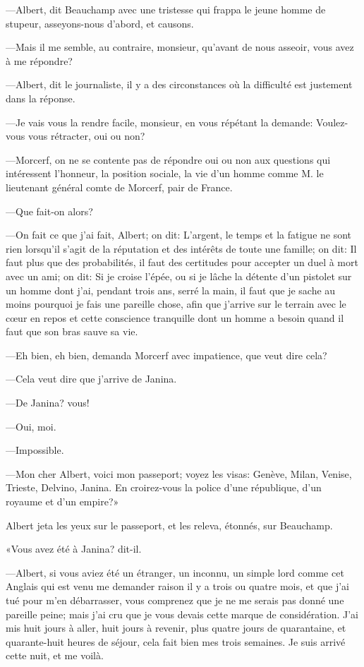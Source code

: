 —Albert, dit Beauchamp avec une tristesse qui frappa le jeune homme de stupeur, asseyons-nous d'abord, et causons. 

—Mais il me semble, au contraire, monsieur, qu'avant de nous asseoir, vous avez à me répondre? 

—Albert, dit le journaliste, il y a des circonstances où la difficulté est justement dans la réponse. 

—Je vais vous la rendre facile, monsieur, en vous répétant la demande: Voulez-vous vous rétracter, oui ou non? 

—Morcerf, on ne se contente pas de répondre oui ou non aux questions qui intéressent l'honneur, la position sociale, la vie d'un homme comme M. le lieutenant général comte de Morcerf, pair de France. 

—Que fait-on alors? 

—On fait ce que j'ai fait, Albert; on dit: L'argent, le temps et la fatigue ne sont rien lorsqu'il s'agit de la réputation et des intérêts de toute une famille; on dit: Il faut plus que des probabilités, il faut des certitudes pour accepter un duel à mort avec un ami; on dit: Si je croise l'épée, ou si je lâche la détente d'un pistolet sur un homme dont j'ai, pendant trois ans, serré la main, il faut que je sache au moins pourquoi je fais une pareille chose, afin que j'arrive sur le terrain avec le cœur en repos et cette conscience tranquille dont un homme a besoin quand il faut que son bras sauve sa vie. 

—Eh bien, eh bien, demanda Morcerf avec impatience, que veut dire cela? 

—Cela veut dire que j'arrive de Janina. 

—De Janina? vous! 

—Oui, moi. 

—Impossible. 

—Mon cher Albert, voici mon passeport; voyez les visas: Genève, Milan, Venise, Trieste, Delvino, Janina. En croirez-vous la police d'une république, d'un royaume et d'un empire?» 

Albert jeta les yeux sur le passeport, et les releva, étonnés, sur Beauchamp. 

«Vous avez été à Janina? dit-il. 

—Albert, si vous aviez été un étranger, un inconnu, un simple lord comme cet Anglais qui est venu me demander raison il y a trois ou quatre mois, et que j'ai tué pour m'en débarrasser, vous comprenez que je ne me serais pas donné une pareille peine; mais j'ai cru que je vous devais cette marque de considération. J'ai mis huit jours à aller, huit jours à revenir, plus quatre jours de quarantaine, et quarante-huit heures de séjour, cela fait bien mes trois semaines. Je suis arrivé cette nuit, et me voilà. 

